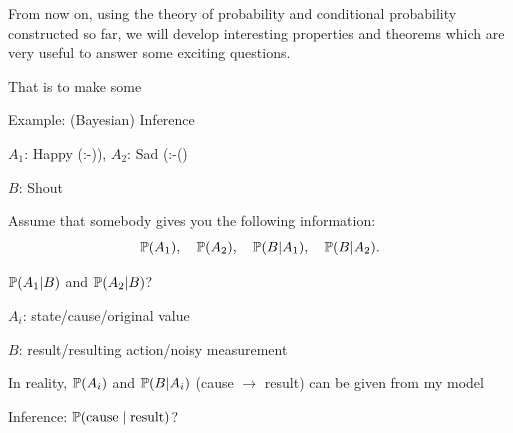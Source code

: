 \begin{frame}{}
\vspace{2cm}
\LARGE From now on, using the theory of probability and conditional probability constructed so far, we will develop interesting properties and theorems which are very useful to answer some exciting questions. 

\medskip

\LARGE That is  to make some 

\end{frame}

\begin{frame}{Example: (Bayesian) Inference}

{
\plitemsep 0.1in
\bci 

\item<2-> $A_1$: Happy (:-)), $A_2$: Sad (:-()
\item<2-> $B$: Shout

\item<4-> Assume that somebody gives you the following information:
$$
\mathbb{P}( A_1 ), \quad \mathbb{P}( A_2 ), \quad \mathbb{P}( B | A_1 ), \quad\mathbb{P}( B | A_2 ).
$$

\item<6->  $\mathbb{P}( A_1 | B )$ and $\mathbb{P}( A_2 | B )$?
\eci 
}
{
\plitemsep 0.1in
\bci 

\item<3-> $A_i$: state/cause/original value
\item<3-> $B$: result/resulting action/noisy measurement

\item<5-> In reality, $\mathbb{P}( A_i )$ and $\mathbb{P}( B | A_i )$ (cause $\rightarrow$ result) can be given from my model

\item<7-> Inference: $\mathbb{P}( \text{cause} \mid \text{result} )$?

\eci 
}

\medskip


\end{frame}

